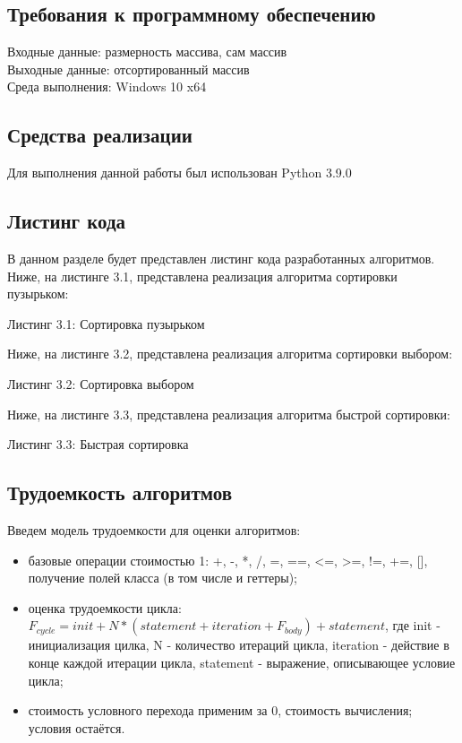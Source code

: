 \documentclass[12pt,a4paper]{article}
\numberwithin{equation}{section}
\begin{document}
\subsection{Требования к программному обеспечению}
Входные данные: размерность массива, сам массив\\
Выходные данные: отсортированный массив\\
Среда выполнения: Windows 10 x64
\subsection{Средства реализации}
\qquad Для выполнения данной работы был использован Python 3.9.0
\subsection{Листинг кода}
\qquad В данном разделе будет представлен листинг кода разработанных алгоритмов.\\

Ниже, на листинге 3.1, представлена реализация алгоритма сортировки пузырьком:
\begin{center}
	Листинг 3.1: Сортировка пузырьком
	
\end{center}
\clearpage

Ниже, на листинге 3.2, представлена реализация алгоритма сортировки выбором:
\begin{center}
	Листинг 3.2: Сортировка выбором
	
\end{center}

Ниже, на листинге 3.3, представлена реализация алгоритма быстрой сортировки:
\begin{center}
	Листинг 3.3: Быстрая сортировка
	
\end{center}
\clearpage

\subsection{Трудоемкость алгоритмов}
\qquad Введем модель трудоемкости для оценки алгоритмов:\\
\begin{itemize}
\item базовые операции стоимостью 1: +, -, *, /, =, ==, <=, >=, !=, +=, [], получение полей класса (в том числе и геттеры);
\item оценка трудоемкости цикла: $F_{cycle} = init +  N*(statement + iteration + F_{body}) + statement$, где init - инициализация цилка, N - количество итераций цикла, iteration - действие в конце каждой итерации цикла, statement - выражение, описывающее условие цикла;
\item стоимость условного перехода применим за 0, стоимость вычисления; условия остаётся.
\end{itemize}
	
\end{document}
